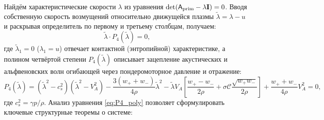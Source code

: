 \documentclass[11pt,a4paper]{article}
\begin{document}
Найдём характеристические скорости $\lambda$ из уравнения $\det(\mathsf{A}_{\rm prim} - \lambda\mathbf{I}) = 0$. Вводя собственную скорость возмущений относительно движущейся плазмы $\tilde{\lambda} = \lambda - u$ и раскрывая определитель по первому и третьему столбцам, получаем:
\begin{equation}
\tilde{\lambda}\cdot P_4(\tilde{\lambda}) = 0,
\label{eq:det_factor}
\end{equation}
где $\tilde{\lambda}_1 = 0$ ($\lambda_1 = u$) отвечает контактной (энтропийной) характеристике, а полином четвёртой степени $P_4(\tilde{\lambda})$ описывает зацепление акустических и альфвеновских волн огибающей через пондеромоторное давление и отражение:
\begin{equation}
P_4(\tilde{\lambda}) = \left(\tilde{\lambda}^2 - c_s^2\right)\left(\tilde{\lambda}^2 - V_A^2\right) - \frac{3(w_+ + w_-)}{4\rho}\tilde{\lambda}^2 - \tilde{\lambda}V_A\left[\frac{w_+ - w_-}{2\rho} + \sigma\mathcal{C}\frac{\sqrt{w_+ w_-}}{2\rho}\right] + \frac{w_+ + w_-}{4\rho}V_A^2 = 0,
\label{eq:P4_poly}
\end{equation}
где $c_s^2 = \gamma p/\rho$. Анализ уравнения \eqref{eq:P4_poly} позволяет сформулировать ключевые структурные теоремы о системе:
\end{document}
